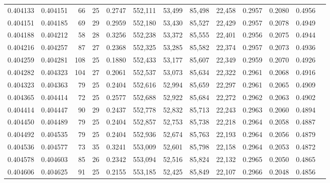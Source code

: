 \begin{tabular}{rrrrrrrrrrrrr}
0.404133 & 0.404151 &    66 &  25 &                                     0.2747 & 552,111 &  53,499 &  85,498 &  22,458 & 0.2957 & 0.2080 & 0.4956 \\
0.404151 & 0.404185 &    69 &  29 &                                     0.2959 & 552,180 &  53,430 &  85,527 &  22,429 & 0.2957 & 0.2078 & 0.4949 \\
0.404188 & 0.404212 &    58 &  28 &                                     0.3256 & 552,238 &  53,372 &  85,555 &  22,401 & 0.2956 & 0.2075 & 0.4944 \\
0.404216 & 0.404257 &    87 &  27 &                                     0.2368 & 552,325 &  53,285 &  85,582 &  22,374 & 0.2957 & 0.2073 & 0.4936 \\
0.404259 & 0.404281 &   108 &  25 &                                     0.1880 & 552,433 &  53,177 &  85,607 &  22,349 & 0.2959 & 0.2070 & 0.4926 \\
0.404282 & 0.404323 &   104 &  27 &                                     0.2061 & 552,537 &  53,073 &  85,634 &  22,322 & 0.2961 & 0.2068 & 0.4916 \\
0.404323 & 0.404363 &    79 &  25 &                                     0.2404 & 552,616 &  52,994 &  85,659 &  22,297 & 0.2961 & 0.2065 & 0.4909 \\
0.404365 & 0.404414 &    72 &  25 &                                     0.2577 & 552,688 &  52,922 &  85,684 &  22,272 & 0.2962 & 0.2063 & 0.4902 \\
0.404414 & 0.404447 &    90 &  29 &                                     0.2437 & 552,778 &  52,832 &  85,713 &  22,243 & 0.2963 & 0.2060 & 0.4894 \\
0.404450 & 0.404489 &    79 &  25 &                                     0.2404 & 552,857 &  52,753 &  85,738 &  22,218 & 0.2964 & 0.2058 & 0.4887 \\
0.404492 & 0.404535 &    79 &  25 &                                     0.2404 & 552,936 &  52,674 &  85,763 &  22,193 & 0.2964 & 0.2056 & 0.4879 \\
0.404536 & 0.404577 &    73 &  35 &                                     0.3241 & 553,009 &  52,601 &  85,798 &  22,158 & 0.2964 & 0.2053 & 0.4872 \\
0.404578 & 0.404603 &    85 &  26 &                                     0.2342 & 553,094 &  52,516 &  85,824 &  22,132 & 0.2965 & 0.2050 & 0.4865 \\
0.404606 & 0.404625 &    91 &  25 &                                     0.2155 & 553,185 &  52,425 &  85,849 &  22,107 & 0.2966 & 0.2048 & 0.4856 \\

\end{tabular}
